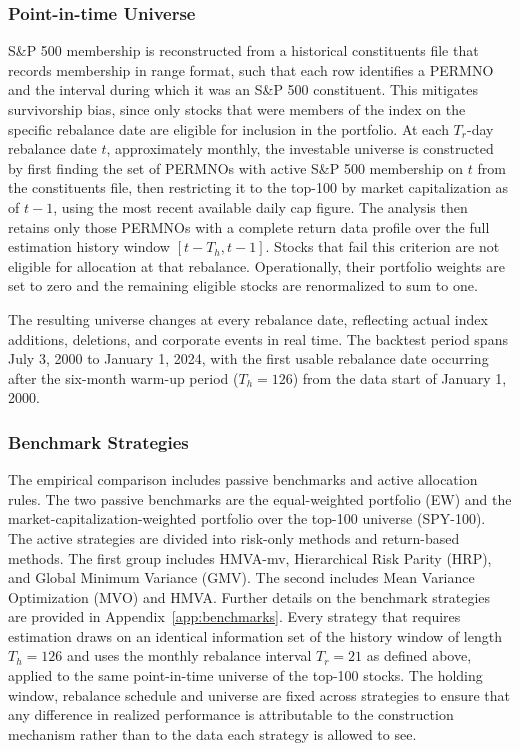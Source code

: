 \documentclass[12pt]{article}
\begin{document}
\subsubsection{Point-in-time Universe}
\label{sec:data-pit}
S\&P 500 membership is reconstructed from a historical constituents file that records membership in range format, such that each row identifies a PERMNO and the interval during which it was an S\&P 500 constituent. This mitigates survivorship bias, since only stocks that were members of the index on the specific rebalance date are eligible for inclusion in the portfolio. At each $T_r$-day rebalance date $t$, approximately monthly, the investable universe is constructed by first finding the set of PERMNOs with active S\&P 500 membership on $t$ from the constituents file, then restricting it to the top-100 by market capitalization as of $t-1$, using the most recent available daily cap figure. The analysis then retains only those PERMNOs with a complete return data profile over the full estimation history window $[t - T_h, t - 1]$. Stocks that fail this criterion are not eligible for allocation at that rebalance. Operationally, their portfolio weights are set to zero and the remaining eligible stocks are renormalized to sum to one.

The resulting universe changes at every rebalance date, reflecting actual index additions, deletions, and corporate events in real time. The backtest period spans July 3, 2000 to January 1, 2024, with the first usable rebalance date occurring after the six-month warm-up period ($T_h=126$) from the data start of January 1, 2000.

\subsubsection{Benchmark Strategies}
\label{sec:data-strategies}
The empirical comparison includes passive benchmarks and active allocation rules. The two passive benchmarks are the equal-weighted portfolio (EW) and the market-capitalization-weighted portfolio over the top-100 universe (SPY-100). The active strategies are divided into risk-only methods and return-based methods. The first group includes HMVA-mv, Hierarchical Risk Parity (HRP), and Global Minimum Variance (GMV). The second includes Mean Variance Optimization (MVO) and HMVA. Further details on the benchmark strategies are provided in Appendix~\ref{app:benchmarks}. Every strategy that requires estimation draws on an identical information set of the history window of length $T_h=126$ and uses the monthly rebalance interval $T_r=21$ as defined above, applied to the same point-in-time universe of the top-100 stocks. The holding window, rebalance schedule and universe are fixed across strategies to ensure that any difference in realized performance is attributable to the construction mechanism rather than to the data each strategy is allowed to see. 
\end{document}

